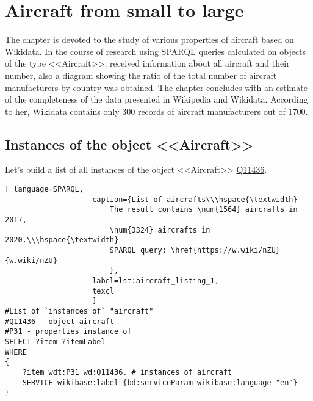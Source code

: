 \setchapterpreamble[u]{\margintoc}
\chapter{Aircraft from small to large\protect\footnotemark}


The chapter is devoted to the study of various properties of aircraft
based on Wikidata.
In the course of research using SPARQL queries calculated on objects of the type <<Aircraft>>,
received information about all aircraft and their number,
also a diagram showing the ratio of the total number of aircraft manufacturers by country was obtained.
The chapter concludes with an estimate of the completeness of the data presented in Wikipedia and Wikidata. According to her, Wikidata contains only
300 records of aircraft manufacturers out of \num{1700}.


\section{Instances of the object <<Aircraft>>}

Let's build a list of all instances of the object <<Aircraft>> \href{https://www.wikidata.org/wiki/Q11436}{Q11436}.

\begin{lstlisting}[ language=SPARQL, 
                    caption={List of aircrafts\\\hspace{\textwidth}
                        The result contains \num{1564} aircrafts in 2017, 
                        \num{3324} aircrafts in 2020.\\\hspace{\textwidth}
                        SPARQL query: \href{https://w.wiki/nZU}{w.wiki/nZU}
                        },
                    label=lst:aircraft_listing_1,
                    texcl 
                    ]
#List of `instances of` "aircraft"
#Q11436 - object aircraft 
#P31 - properties instance of
SELECT ?item ?itemLabel
WHERE
{
    ?item wdt:P31 wd:Q11436. # instances of aircraft
    SERVICE wikibase:label {bd:serviceParam wikibase:language "en"}
}
\end{lstlisting}


